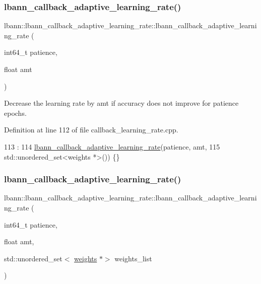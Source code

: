 \subsubsection{\texorpdfstring{lbann\+\_\+callback\+\_\+adaptive\+\_\+learning\+\_\+rate()}{lbann\_callback\_adaptive\_learning\_rate()}\hspace{0.1cm}{\footnotesize\ttfamily [1/3]}}
{\footnotesize\ttfamily lbann\+::lbann\+\_\+callback\+\_\+adaptive\+\_\+learning\+\_\+rate\+::lbann\+\_\+callback\+\_\+adaptive\+\_\+learning\+\_\+rate (\begin{DoxyParamCaption}\item[{int64\+\_\+t}]{patience,  }\item[{float}]{amt }\end{DoxyParamCaption})}

Decrease the learning rate by amt if accuracy does not improve for patience epochs. 

Definition at line 112 of file callback\+\_\+learning\+\_\+rate.\+cpp.


\begin{DoxyCode}
113                                :
114   \hyperlink{classlbann_1_1lbann__callback__adaptive__learning__rate_a2095e4c430b3c4f206e85c963e1ec2aa}{lbann\_callback\_adaptive\_learning\_rate}(patience, amt,
115                                         std::unordered\_set<weights *>()) \{\}
\end{DoxyCode}
\mbox{\label{classlbann_1_1lbann__callback__adaptive__learning__rate_a49343d73d0be9782b0480c07aeda6046}} 
\subsubsection{\texorpdfstring{lbann\+\_\+callback\+\_\+adaptive\+\_\+learning\+\_\+rate()}{lbann\_callback\_adaptive\_learning\_rate()}\hspace{0.1cm}{\footnotesize\ttfamily [2/3]}}
{\footnotesize\ttfamily lbann\+::lbann\+\_\+callback\+\_\+adaptive\+\_\+learning\+\_\+rate\+::lbann\+\_\+callback\+\_\+adaptive\+\_\+learning\+\_\+rate (\begin{DoxyParamCaption}\item[{int64\+\_\+t}]{patience,  }\item[{float}]{amt,  }\item[{std\+::unordered\+\_\+set$<$ \hyperlink{classlbann_1_1weights}{weights} $\ast$$>$}]{weights\+\_\+list }\end{DoxyParamCaption})}



